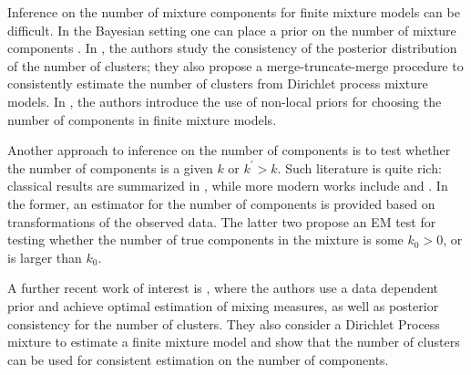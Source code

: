 \documentclass[12pt, reqno]{amsart}
\theoremstyle{definition}
\begin{document}

Inference on the number of mixture components for finite mixture models can be difficult. In the Bayesian setting one can place a prior on the number of mixture components \cite{miller}. In \cite{guha}, the authors study the consistency of the posterior distribution of the number of
clusters; they also propose a merge-truncate-merge procedure to consistently estimate the number of
clusters from Dirichlet process mixture models. 
In \cite{fuquene}, the authors introduce the use of non-local priors for choosing the number of components in finite mixture models.


Another approach to inference on the number of components is to test whether
the number of components is a given $k$ or $k^\prime>k$. Such literature is quite rich: classical results are summarized in \cite{titterington}, while more modern works include \cite{henna} and \cite{chen,li2}. In the former, an estimator for the number of components is provided based on transformations of the observed data. The latter two propose an EM test for testing whether the number of true components in the mixture is some $k_0>0$, or is larger than $k_0$.

A further recent work of interest is \cite{ohn}, where the authors use a data dependent prior and achieve optimal estimation of mixing measures, as well as posterior consistency for the number of clusters. They also consider a Dirichlet Process mixture to estimate a finite mixture model and show that the number of clusters can be used for consistent estimation on the number of components.
\fi
\end{document}
